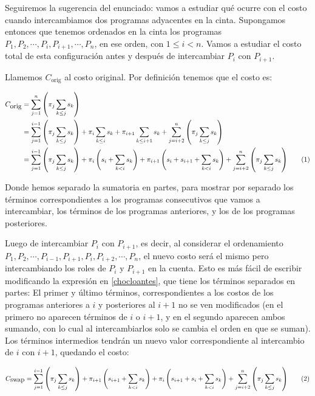 \documentclass{article}
\newcommand\numberthis{\refstepcounter{equation}\tag{\theequation}}
\begin{document}
Seguiremos la sugerencia del enunciado: vamos a estudiar qué ocurre con el costo cuando intercambiamos dos programas adyacentes en la cinta. Supongamos entonces que tenemos ordenados en
la cinta los programas $P_1,P_2,\cdots,P_i, P_{i+1}, \cdots, P_n$, en ese orden, con $1 \leq i < n$. Vamos a estudiar el costo total de esta configuración antes y después de intercambiar
$P_i$ con $P_{i+1}$.

Llamemos $C_{\mbox{orig}}$ al costo original. Por definición tenemos que el costo es:

\begin{align*}
C_{\mbox{orig}} &= \sum_{j=1}^{n}{\left ( \pi_{j} \sum_{k \leq j}{s_{k}}  \right )} \\ 
                &= \sum_{j=1}^{i-1}{\left ( \pi_{j} \sum_{k \leq j}{s_{k}}  \right )} + \pi_{i} \sum_{k \leq i}{s_{k}} + \pi_{i+1} \sum_{k \leq i+1}{s_{k}}  + \sum_{j=i+2}^{n}{\left ( \pi_{j} \sum_{k \leq j}{s_{k}}  \right )} \\
                &= \sum_{j=1}^{i-1}{\left ( \pi_{j} \sum_{k \leq j}{s_{k}}  \right )} + \pi_{i} \left(s_i + \sum_{k < i}{s_{k}} \right) + \pi_{i+1} \left(s_i + s_{i+1} + \sum_{k < i}{s_{k}} \right)  + \sum_{j=i+2}^{n}{\left ( \pi_{j} \sum_{k \leq j}{s_{k}}  \right )} \numberthis \label{chocloantes}
\end{align*}

Donde hemos separado la sumatoria en partes, para mostrar por separado los términos correspondientes a los programas consecutivos que vamos a intercambiar, los términos de los programas anteriores, y los de los programas posteriores.

Luego de intercambiar $P_i$ con $P_{i+1}$, es decir, al considerar el ordenamiento
$P_1,P_2,\cdots,P_{i-1}, P_{i+1}, P_{i}, P_{i+2}, \cdots, P_n$, el nuevo costo será el mismo pero intercambiando los roles de $P_i$ y $P_{i+1}$ en la cuenta. Esto es más fácil de escribir modificando la expresión en \ref{chocloantes}, que tiene los
términos separados en partes: El primer y último términos, correspondientes a los costos de los programas anteriores a $i$ y posteriores al $i+1$ no se ven modificados (en el primero no aparecen términos de $i$ o $i+1$, y en el segundo aparecen ambos sumando, con lo cual al intercambiarlos solo se cambia el orden en que se suman).
Los términos intermedios tendrán un nuevo valor correspondiente al intercambio de $i$ con $i+1$, quedando el costo:

\begin{align*}
C_{\mbox{swap}} = \sum_{j=1}^{i-1}{\left ( \pi_{j} \sum_{k \leq j}{s_{k}}  \right )} + \pi_{i+1} \left(s_{i+1} + \sum_{k < i}{s_{k}} \right) + \pi_{i} \left(s_{i+1} + s_{i} + \sum_{k < i}{s_{k}} \right)  + \sum_{j=i+2}^{n}{\left ( \pi_{j} \sum_{k \leq j}{s_{k}}  \right )} \numberthis \label{choclodespues}
\end{align*}
\end{document}
